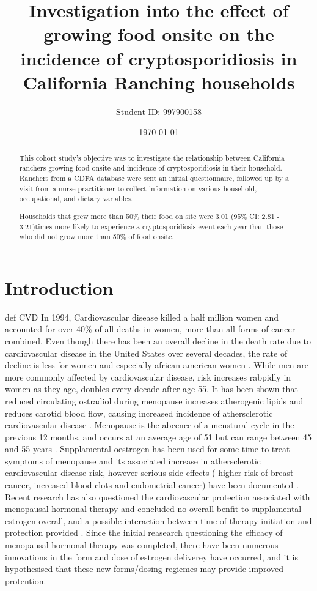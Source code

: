 \documentclass[12pt]{article}
\title{Investigation into the effect of growing food onsite on the incidence of cryptosporidiosis in California Ranching households}
\author{Student ID: 997900158}
\date{\today}
\begin{document}
	\maketitle
	\begin{abstract}
		This cohort study's objective was to investigate the relationship between California ranchers growing food onsite and incidence of cryptosporidiosis in their household.
		Ranchers from a CDFA database were sent an initial questionnaire, followed up by a visit from a nurse practitioner to collect information on various household, occupational, and dietary variables.


		Households that grew more than 50\% their food  on site were 3.01 (95\% CI: 2.81 - 3.21)times more likely to experience a cryptosporidiosis event each year than those who did not grow more than 50\% of food onsite.

	\end{abstract}

\onehalfspace
	\section{Introduction} 
		def CVD 
		In 1994, Cardiovascular disease killed a half million women and accounted for over 40\% of all deaths in women, more than all forms of cancer combined\cite{AHA1997}.
		Even though there has been an overall decline in the death rate due to cardiovascular disease in the United States over several decades, the rate of decline is less for women and especially african-american women \cite{Mosca1997}.
		While men are more commonly affected by cardiovascular disease, risk increases rabpidly in women as they age, doubles every decade after age 55\cite{Gordon1978}. 
		It has been shown that reduced circulating ostradiol during menopause increases atherogenic lipids and reduces carotid blood flow, causing increased incidence of athersclerotic cardiovascular disease \cite{Hodis}.
		Menopause is the abcence of a menstural cycle in the previous 12 months, and occurs at an average age of 51 but can range between 45 and 55 years \cite{Gold2012}. 
		Supplamental oestrogen has been used for some time to treat symptoms of menopause and its associated increase in athersclerotic cardiovascular disease risk, however serious side effects ( higher risk of breast cancer, increased blood clots and endometrial cancer) have been documented \cite{Gold2012}.
		Recent research has also questioned the cardiovascular protection associated with menopausal hormonal therapy and concluded no overall benfit to supplamental estrogen overall, and a possible interaction between time of therapy initiation and protection provided \cite{Anderson2004,Prentice2009}.
		Since the initial reasearch questioning the efficacy of menopausal hormonal therapy was completed, there have been numerous innovations in the form and dose of estrogen deliverey have occurred, and it is hypothesised that these new forms/dosing regiemes may provide improved protention.
\end{document}
